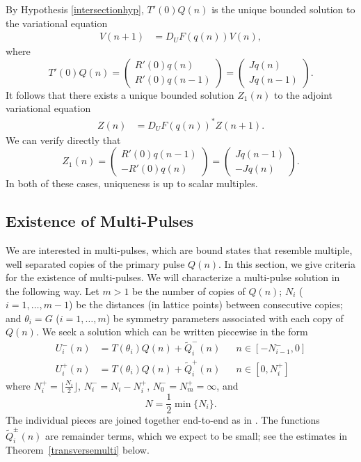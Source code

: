 \documentclass[12pt]{article}
\begin{document}
By Hypothesis \ref{intersectionhyp}, $T'(0) Q(n)$ is the unique bounded solution to the variational equation
\begin{align*}
V(n+1) &= D_U F(q(n)) V(n),
\end{align*}
where
\begin{equation}\label{varsol}
T'(0) Q(n) = \begin{pmatrix} R'(0) q(n) \\ R'(0) q(n-1) \end{pmatrix} = \begin{pmatrix} J q(n) \\ J q(n-1) \end{pmatrix}.
\end{equation}
It follows that there exists a unique bounded solution $Z_1(n)$ to the adjoint variational equation
\begin{align*}
Z(n) &= D_U F(q(n))^* Z(n+1).
\end{align*}
We can verify directly that
\begin{equation}\label{adjvarsol}
Z_1(n) = \begin{pmatrix} R'(0) q(n-1) \\ -R'(0) q(n) \end{pmatrix} = \begin{pmatrix} J q(n-1) \\ -J q(n) \end{pmatrix}.
\end{equation}
In both of these cases, uniqueness is up to scalar multiples.

\subsection{Existence of Multi-Pulses}

We are interested in multi-pulses, which are bound states that resemble multiple, well separated copies of the primary pulse $Q(n)$. In this section, we give criteria for the existence of multi-pulses. We will characterize a multi-pulse solution in the following way. Let $m > 1$ be the number of copies of $Q(n)$; $N_i$ ($i = 1, \dots, m-1$) be the distances (in lattice points) between consecutive copies; and $\theta_i = G$ ($i = 1, \dots, m$) be symmetry parameters associated with each copy of $Q(n)$. We seek a solution which can be written piecewise in the form 
\begin{equation}\label{Upiecewise}
\begin{aligned}
U_i^-(n) &= T(\theta_i) Q(n) + \tilde{Q}_i^-(n) && n \in [-N_{i-1}^-, 0] \\
U_i^+(n) &= T(\theta_i) Q(n) + \tilde{Q}_i^+(n) && n \in [0, N_i^+]
\end{aligned}
\end{equation}
where $N_i^+ = \lfloor \frac{N_i}{2} \rfloor$, $N_i^- = N_i - N_i^+$, $N_0^- = N_m^+ = \infty$, and
\begin{equation}\label{defN}
N = \frac{1}{2} \min\{ N_i \}.
\end{equation}
The individual pieces are joined together end-to-end as in \cite{Sandstede1998}. The functions $\tilde{Q}_i^\pm(n)$ are remainder terms, which we expect to be small; see the estimates in Theorem~\ref{transversemulti} below.
\end{document}
